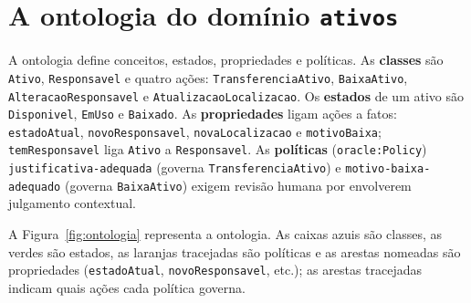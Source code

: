 \documentclass[11pt,a4paper]{article}
\begin{document}
\section{A ontologia do domínio \texttt{ativos}}
A ontologia define conceitos, estados, propriedades e políticas. As \textbf{classes} são \texttt{Ativo}, \texttt{Responsavel} e quatro ações: \texttt{TransferenciaAtivo}, \texttt{BaixaAtivo}, \texttt{AlteracaoResponsavel} e \texttt{AtualizacaoLocalizacao}. Os \textbf{estados} de um ativo são \texttt{Disponivel}, \texttt{EmUso} e \texttt{Baixado}. As \textbf{propriedades} ligam ações a fatos: \texttt{estadoAtual}, \texttt{novoResponsavel}, \texttt{novaLocalizacao} e \texttt{motivoBaixa}; \texttt{temResponsavel} liga \texttt{Ativo} a \texttt{Responsavel}. As \textbf{políticas} (\texttt{oracle:Policy}) \texttt{justificativa-adequada} (governa \texttt{TransferenciaAtivo}) e \texttt{motivo-baixa-adequado} (governa \texttt{BaixaAtivo}) exigem revisão humana por envolverem julgamento contextual.

A Figura~\ref{fig:ontologia} representa a ontologia. As caixas azuis são classes, as verdes são estados, as laranjas tracejadas são políticas e as arestas nomeadas são propriedades (\texttt{estadoAtual}, \texttt{novoResponsavel}, etc.); as arestas tracejadas indicam quais ações cada política governa.
\end{document}
